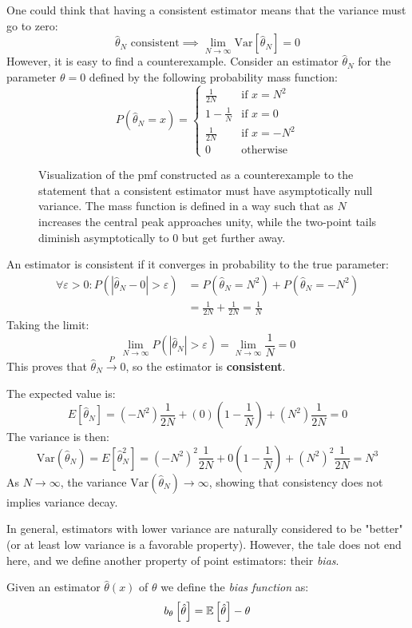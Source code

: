 \begin{example}
	One could think that having a consistent estimator means that the variance must go to zero:
	\[
	\hat{\theta}_N \text{ consistent} \implies \lim_{N \to \infty} \text{Var}\left[\hat{\theta}_N\right] = 0
	\]
	However, it is easy to find a counterexample. Consider an estimator $\hat{\theta}_N$ for the parameter $\theta = 0$ defined by the following probability mass function:
	\[
	P(\hat{\theta}_N = x) = 
	\begin{cases} 
		\frac{1}{2N} & \text{if } x = N^2 \\
		1 - \frac{1}{N} & \text{if } x = 0 \\
		\frac{1}{2N} & \text{if } x = -N^2 \\
		0 & \text{otherwise}
	\end{cases}
	\]
	
	\begin{figure}[H]
		\centering
		
		\caption{Visualization of the pmf constructed as a counterexample to the statement that a consistent estimator must have asymptotically null variance. The mass function is defined in a way such that as $N$ increases the central peak approaches unity, while the two-point tails diminish asymptotically to $0$ but get further away.}
	\end{figure}
	
	An estimator is consistent if it converges in probability to the true parameter: 
	\begin{align*}
		\forall \varepsilon > 0: P(|\hat{\theta}_N - 0| > \varepsilon) &= P(\hat{\theta}_N = N^2) + P(\hat{\theta}_N = -N^2) \\
		&= \frac{1}{2N} + \frac{1}{2N} = \frac{1}{N}
	\end{align*}
	Taking the limit:
	\[
	\lim_{N \to \infty} P(|\hat{\theta}_N| > \varepsilon) = \lim_{N \to \infty} \frac{1}{N} = 0
	\]
	This proves that $\hat{\theta}_N \xrightarrow{P} 0$, so the estimator is \textbf{consistent}.
	
	The expected value is:
	\[
	E[\hat{\theta}_N] = (-N^2)\frac{1}{2N} + (0)(1-\frac{1}{N}) + (N^2)\frac{1}{2N} = 0
	\]
	The variance is then:
	\[
	\text{Var}(\hat{\theta}_N) = E[\hat{\theta}_N^2] = (-N^2)^2 \frac{1}{2N} + 0 \left(1 - \frac{1}{N}\right) + (N^2)^2 \frac{1}{2N} = N^3
	\]
	As $N \to \infty$, the variance $\text{Var}(\hat{\theta}_N) \to \infty$, showing that consistency does not implies variance decay.
\end{example}


In general, estimators with lower variance are naturally considered to be "better" (or at least low variance is a favorable property). However, the tale does not end here, and we define another property of point estimators: their \emph{bias}.
\begin{definition}
	Given an estimator $\hat{\theta}(x)$ of $\theta$ we define the \emph{bias function} as:
	\[
	b_\theta\left[\hat\theta\right]=\mathbb{E}\left[\hat{\theta}\right]-\theta
	\]
\end{definition}

